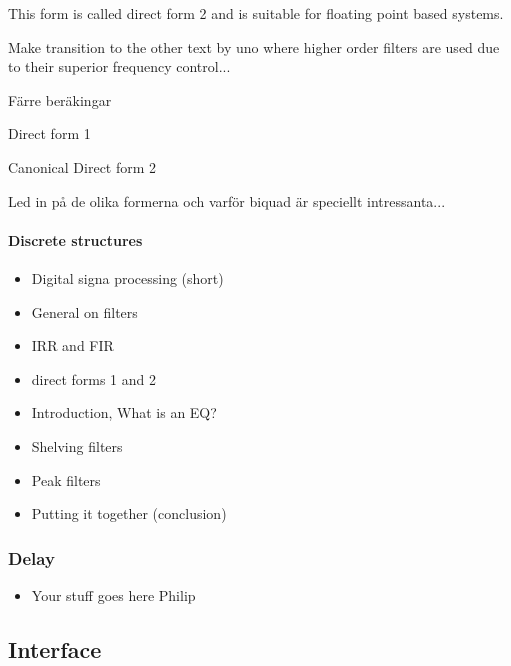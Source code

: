 \documentclass[12p]{article}
\begin{document}
This form is called direct form 2 and is suitable for floating point based systems.

Make transition to the other text by uno where higher order filters are used due to their superior frequency control...



Färre beräkingar

Direct form 1

Canonical Direct form 2

Led in på de olika formerna och varför biquad är speciellt intressanta...



\paragraph{Discrete structures}












\begin{itemize}
\item Digital signa processing (short)
\item General on filters
\item IRR and FIR
\item direct forms 1 and 2
\item Introduction, What is an EQ?
\item Shelving filters
\item Peak filters
\item Putting it together (conclusion)
\end{itemize}

\subsubsection{Delay}
\begin{itemize}
\item Your stuff goes here Philip
\end{itemize}

\subsection{Interface}
\label{Theory:Interface}
\end{document}

